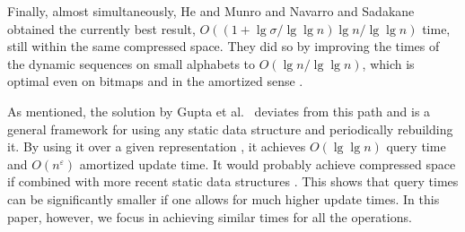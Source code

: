 \documentclass[11pt]{article}
\newcommand{\eps}{\varepsilon}
\begin{document}
Finally, almost simultaneously, He and Munro \cite{HM10} and Navarro and 
Sadakane \cite{NS10} obtained the currently best result, 
$O((1+\lg\sigma/\lg\lg n)\lg n /\lg\lg n)$ time, still within the same 
compressed space. They did so by improving the times of
the dynamic sequences on small alphabets to $O(\lg n / \lg\lg n)$, which is
optimal even on bitmaps and in the amortized sense \cite{FS89}. 

As mentioned, the solution by Gupta et al.~\cite{GHSV07} deviates from this
path and is a general framework for using any static data structure
and periodically rebuilding it. By using it over a given representation
\cite{GMR06}, it achieves $O(\lg\lg n)$ query time and $O(n^\eps)$ amortized
update time. It would probably achieve compressed space if combined with more
recent static data structures \cite{BGNN10}. This shows that query times can
be significantly smaller if one allows for much higher update times. In this
paper, however, we focus in achieving similar times for all the
operations.
\end{document}
